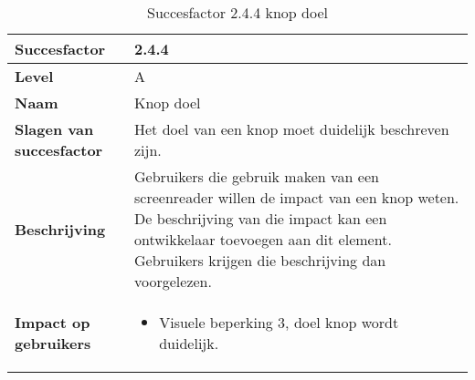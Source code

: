 \begin{table}[H]
    \centering
    \caption{Succesfactor 2.4.4 knop doel}
    
    
    \hspace*{-1cm}\begin{tabular}{|l|p{12cm}|} 
        \hline
        \textbf{Succesfactor}                 & 2.4.4                                                                                                                                                                                                                                                                                                                                                                                                                                                                                                          \\ 
        \hline
        \textbf{Level}                        & A                                                                                                                                                                                                                                                                                                                                                                                                                                                                                                                 \\ 
        \hline
        \textbf{Naam}                         & Knop doel~                                                                                                                                                                                                                                                                                                                                                                                                                                                                                      \\ 
        \hline
        \textbf{Slagen van succesfactor}      & Het doel van een knop moet duidelijk beschreven zijn.                                                                                                                                 \\ 
        
        \hline
        \textbf{Beschrijving}                 & Gebruikers die gebruik maken van een screenreader willen de impact van een knop weten. De beschrijving van die impact kan een ontwikkelaar toevoegen aan dit element. Gebruikers krijgen die beschrijving dan voorgelezen.\\ 
        \hline
        \textbf{Impact op gebruikers}         &  
        \begin{itemize}
            \item Visuele beperking 3, doel knop wordt duidelijk.
           

\end{itemize}
\end{tabular}
\end{table}

